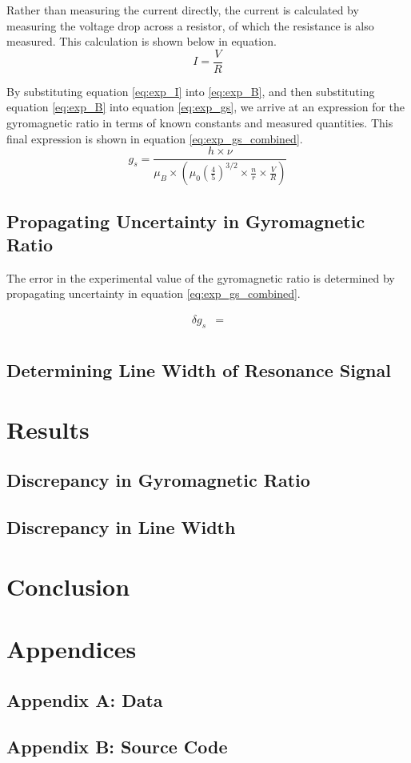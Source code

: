 \documentclass[a4paper]{article}
\begin{document}
\qq Rather than measuring the current directly, the current is calculated by measuring the voltage drop across a resistor, of which the resistance is also measured. This calculation is shown below in equation.
\begin{equation}
\label{eq:exp_I}
I = \frac{V}{R}
\end{equation}

\qq By substituting equation \ref{eq:exp_I} into \ref{eq:exp_B}, and then substituting equation \ref{eq:exp_B} into equation \ref{eq:exp_gs}, we arrive at an expression for the gyromagnetic ratio in terms of known constants and measured quantities. This final expression is shown in equation \ref{eq:exp_gs_combined}.
\begin{equation}
\label{eq:exp_gs_combined}
g_s = \frac{h \times \nu}{\mu_B \times \left( \mu_0 \left( \frac{4}{5} \right) ^{3/2} \times \frac{n}{r} \times \frac{V}{R} \right) }
\end{equation}

\subsection{Propagating Uncertainty in Gyromagnetic Ratio}
\qq The error in the experimental value of the gyromagnetic ratio is determined by propagating uncertainty in equation \ref{eq:exp_gs_combined}.

\begin{align*}
\delta g_s &= \\
\end{align*}

\subsection{Determining Line Width of Resonance Signal}
\qq 

\section{Results}
\qq

\subsection{Discrepancy in Gyromagnetic Ratio}
\qq 

\subsection{Discrepancy in Line Width}
\qq 

\section{Conclusion}
\qq 

\section{Appendices}

\subsection{Appendix A: Data}

\subsection{Appendix B: Source Code}
\end{document}

